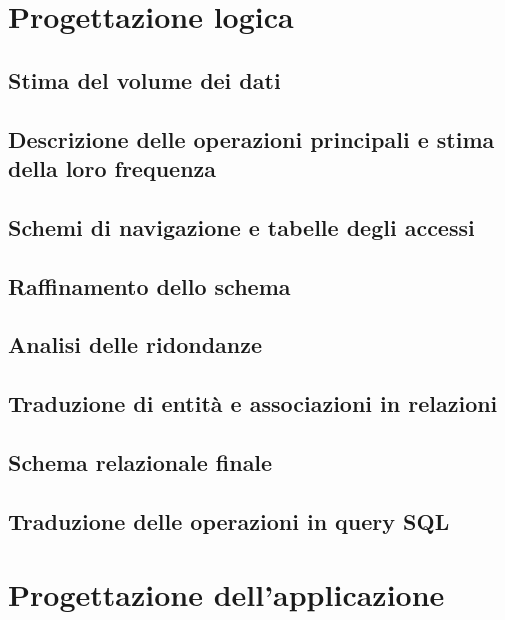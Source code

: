 \documentclass[a4paper,11pt]{report}
\begin{document}
\chapter{Progettazione logica}
\section{Stima del volume dei dati}

\section{Descrizione delle operazioni principali e stima della loro frequenza}

\section{Schemi di navigazione e tabelle degli accessi}

\section{Raffinamento dello schema}

\section{Analisi delle ridondanze}

\section{Traduzione di entità e associazioni in relazioni}

\section{Schema relazionale finale}

\section{Traduzione delle operazioni in query SQL}


\chapter{Progettazione dell'applicazione}
\end{document}
